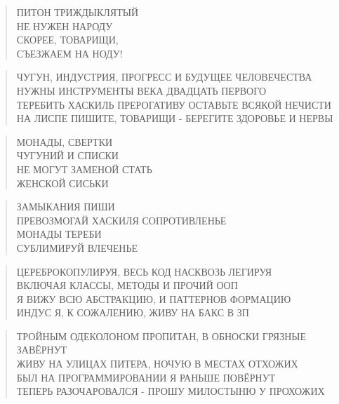 \poemtitle{***}
\begin{verse}
ПИТОН ТРИЖДЫКЛЯТЫЙ\\
НЕ НУЖЕН НАРОДУ\\
СКОРЕЕ, ТОВАРИЩИ,\\
СЪЕЗЖАЕМ НА НОДУ!
\end{verse}

\poemtitle{***}
\begin{verse}
ЧУГУН, ИНДУСТРИЯ, ПРОГРЕСС И БУДУЩЕЕ ЧЕЛОВЕЧЕСТВА\\
    НУЖНЫ ИНСТРУМЕНТЫ ВЕКА ДВАДЦАТЬ ПЕРВОГО\\
ТЕРЕБИТЬ ХАСКИЛЬ ПРЕРОГАТИВУ ОСТАВЬТЕ ВСЯКОЙ НЕЧИСТИ\\
    НА ЛИСПЕ ПИШИТЕ, ТОВАРИЩИ - БЕРЕГИТЕ ЗДОРОВЬЕ И НЕРВЫ
\end{verse}

\poemtitle{***}
\begin{verse}
МОНАДЫ, СВЕРТКИ\\
ЧУГУНИЙ И СПИСКИ\\
НЕ МОГУТ ЗАМЕНОЙ СТАТЬ\\
ЖЕНСКОЙ СИСЬКИ
\end{verse}

\poemtitle{***}
\begin{verse}
ЗАМЫКАНИЯ ПИШИ\\
ПРЕВОЗМОГАЙ ХАСКИЛЯ СОПРОТИВЛЕНЬЕ \\
МОНАДЫ ТЕРЕБИ\\
СУБЛИМИРУЙ ВЛЕЧЕНЬЕ
\end{verse}

\poemtitle{***}
\begin{verse}
ЦЕРЕБРОКОПУЛИРУЯ, ВЕСЬ КОД НАСКВОЗЬ ЛЕГИРУЯ\\
ВКЛЮЧАЯ КЛАССЫ, МЕТОДЫ И ПРОЧИЙ ООП\\
Я ВИЖУ ВСЮ АБСТРАКЦИЮ, И ПАТТЕРНОВ ФОРМАЦИЮ\\
ИНДУС Я, К СОЖАЛЕНИЮ, ЖИВУ НА БАКС В ЗП
\end{verse}

\poemtitle{***}
\begin{verse}
ТРОЙНЫМ ОДЕКОЛОНОМ ПРОПИТАН, В ОБНОСКИ ГРЯЗНЫЕ ЗАВЁРНУТ\\
ЖИВУ НА УЛИЦАХ ПИТЕРА, НОЧУЮ В МЕСТАХ ОТХОЖИХ\\
БЫЛ НА ПРОГРАММИРОВАНИИ Я РАНЬШЕ ПОВЁРНУТ\\
ТЕПЕРЬ РАЗОЧАРОВАЛСЯ - ПРОШУ МИЛОСТЫНЮ У ПРОХОЖИХ
\end{verse}

